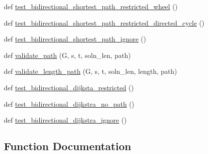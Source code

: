 \begin{DoxyCompactItemize}
\item 
def \hyperlink{namespacenetworkx_1_1algorithms_1_1tests_1_1test__simple__paths_a18238380c431a71b857a8557a8da8ac3}{test\+\_\+bidirectional\+\_\+shortest\+\_\+path\+\_\+restricted\+\_\+wheel} ()
\item 
def \hyperlink{namespacenetworkx_1_1algorithms_1_1tests_1_1test__simple__paths_a38170fe3bee7ec476bf0d9648973efdb}{test\+\_\+bidirectional\+\_\+shortest\+\_\+path\+\_\+restricted\+\_\+directed\+\_\+cycle} ()
\item 
def \hyperlink{namespacenetworkx_1_1algorithms_1_1tests_1_1test__simple__paths_affafe685ad5237ded108713f1a6febf5}{test\+\_\+bidirectional\+\_\+shortest\+\_\+path\+\_\+ignore} ()
\item 
def \hyperlink{namespacenetworkx_1_1algorithms_1_1tests_1_1test__simple__paths_a1aaa70999290a6ce43f019694d5fba5b}{validate\+\_\+path} (G, s, t, soln\+\_\+len, path)
\item 
def \hyperlink{namespacenetworkx_1_1algorithms_1_1tests_1_1test__simple__paths_a5201efd7361d291220d7ba1437f9e8a1}{validate\+\_\+length\+\_\+path} (G, s, t, soln\+\_\+len, length, path)
\item 
def \hyperlink{namespacenetworkx_1_1algorithms_1_1tests_1_1test__simple__paths_a7eb845e0667c1baa0d9d9455a01645e2}{test\+\_\+bidirectional\+\_\+dijksta\+\_\+restricted} ()
\item 
def \hyperlink{namespacenetworkx_1_1algorithms_1_1tests_1_1test__simple__paths_a824750088604c8ce0515d35b649f2931}{test\+\_\+bidirectional\+\_\+dijkstra\+\_\+no\+\_\+path} ()
\item 
def \hyperlink{namespacenetworkx_1_1algorithms_1_1tests_1_1test__simple__paths_a3a53c18194b95f7ac4940d22fc753fcf}{test\+\_\+bidirectional\+\_\+dijkstra\+\_\+ignore} ()
\end{DoxyCompactItemize}


\subsection{Function Documentation}
\mbox{\label{namespacenetworkx_1_1algorithms_1_1tests_1_1test__simple__paths_aabf8497a7dd9e3bea6ed94e7e8ab4cfb}} 

